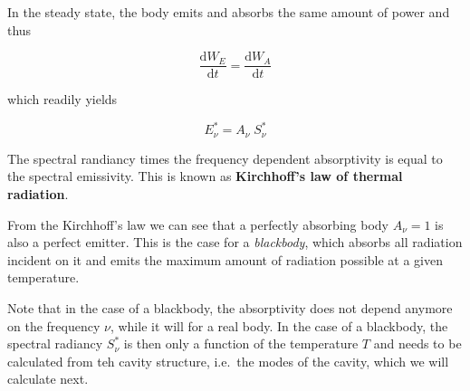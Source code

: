 \documentclass[
  a4paper,
]{book}
\begin{document}
In the steady state, the body emits and absorbs the same amount of power
and thus

\[
\frac{\mathrm{d} W_{E}}{\mathrm{d} t} = \frac{\mathrm{d} W_{A}}{\mathrm{d} t}
\]

which readily yields

\[
E^{\ast}_{\nu} = A_{\nu} \; S^{\ast}_{\nu}
\]

The spectral randiancy times the frequency dependent absorptivity is
equal to the spectral emissivity. This is known as \textbf{Kirchhoff's
law of thermal radiation}.

From the Kirchhoff's law we can see that a perfectly absorbing body
\(A_{\nu}=1\) is also a perfect emitter. This is the case for a
\emph{blackbody}, which absorbs all radiation incident on it and emits
the maximum amount of radiation possible at a given temperature.

Note that in the case of a blackbody, the absorptivity does not depend
anymore on the frequency \(\nu\), while it will for a real body. In the
case of a blackbody, the spectral radiancy \(S^{\ast}_{\nu}\) is then
only a function of the temperature \(T\) and needs to be calculated from
teh cavity structure, i.e.~the modes of the cavity, which we will
calculate next.
\end{document}
